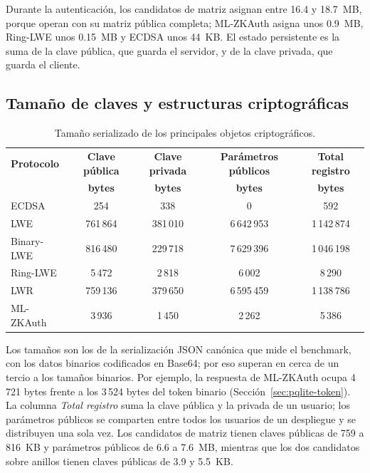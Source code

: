 Durante la autenticación, los candidatos de matriz asignan entre 16.4 y 18.7~MB, porque operan con su matriz pública completa; ML-ZKAuth asigna unos 0.9~MB, Ring-LWE unos 0.15~MB y ECDSA unos 44~KB. El estado persistente es la suma de la clave pública, que guarda el servidor, y de la clave privada, que guarda el cliente.


\subsection{Tamaño de claves y estructuras criptográficas}
\label{sec:key-size-results}

\begin{table}[H]
\centering
\caption{Tamaño serializado de los principales objetos criptográficos.}
\label{tab:key-sizes}
\small
\begin{tabularx}{\textwidth}{lCCCC}
\toprule
\textbf{Protocolo} &
\textbf{Clave pública} &
\textbf{Clave privada} &
\textbf{Parámetros públicos} &
\textbf{Total registro} \\
&
\textbf{bytes} &
\textbf{bytes} &
\textbf{bytes} &
\textbf{bytes} \\
\midrule

ECDSA      & 254 & 338 & 0 & 592 \\
LWE        & 761\,864 & 381\,010 & 6\,642\,953 & 1\,142\,874 \\
Binary-LWE & 816\,480 & 229\,718 & 7\,629\,396 & 1\,046\,198 \\
Ring-LWE   & 5\,472 & 2\,818 & 6\,002 & 8\,290 \\
LWR        & 759\,136 & 379\,650 & 6\,595\,459 & 1\,138\,786 \\
ML-ZKAuth  & 3\,936 & 1\,450 & 2\,262 & 5\,386 \\

\bottomrule
\end{tabularx}
\end{table}

Los tamaños son los de la serialización JSON canónica que mide el benchmark, con los datos binarios codificados en Base64; por eso superan en cerca de un tercio a los tamaños binarios. Por ejemplo, la respuesta de ML-ZKAuth ocupa 4\,721 bytes frente a los 3\,524 bytes del token binario (Sección~\ref{sec:pqlite-token}). La columna \textit{Total registro} suma la clave pública y la privada de un usuario; los parámetros públicos se comparten entre todos los usuarios de un despliegue y se distribuyen una sola vez. Los candidatos de matriz tienen claves públicas de 759 a 816~KB y parámetros públicos de 6.6 a 7.6~MB, mientras que los dos candidatos sobre anillos tienen claves públicas de 3.9 y 5.5~KB.



